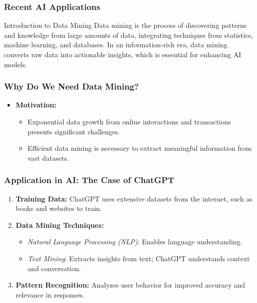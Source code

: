 \documentclass[aspectratio=169]{beamer}
\begin{document}
\begin{frame}[fragile]
    \frametitle{Recent AI Applications}
    \begin{block}{Introduction to Data Mining}
        Data mining is the process of discovering patterns and knowledge from large amounts of data, integrating techniques from statistics, machine learning, and databases. In an information-rich era, data mining converts raw data into actionable insights, which is essential for enhancing AI models.
    \end{block}
\end{frame}

\begin{frame}[fragile]
    \frametitle{Why Do We Need Data Mining?}
    \begin{itemize}
        \item \textbf{Motivation:}
        \begin{itemize}
            \item Exponential data growth from online interactions and transactions presents significant challenges.
            \item Efficient data mining is necessary to extract meaningful information from vast datasets.
        \end{itemize}
    \end{itemize}
\end{frame}

\begin{frame}[fragile]
    \frametitle{Application in AI: The Case of ChatGPT}
    \begin{enumerate}
        \item \textbf{Training Data:} 
            ChatGPT uses extensive datasets from the internet, such as books and websites to train.
        
        \item \textbf{Data Mining Techniques:}
            \begin{itemize}
                \item \textit{Natural Language Processing (NLP)}: Enables language understanding.
                \item \textit{Text Mining}: Extracts insights from text; ChatGPT understands context and conversation.
            \end{itemize}
        
        \item \textbf{Pattern Recognition:} 
            Analyzes user behavior for improved accuracy and relevance in responses.
    \end{enumerate}
\end{frame}
\end{document}
